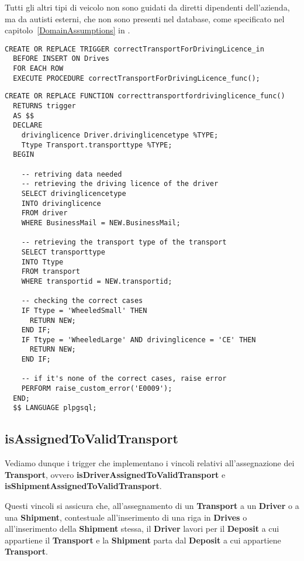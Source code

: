 Tutti gli altri tipi di veicolo non sono guidati da diretti dipendenti dell'azienda, ma da autisti esterni, che non sono presenti nel database, come specificato nel capitolo~\ref{DomainAssumptions} in .

\begin{lstlisting}[caption={Trigger per il vincolo \textbf{correctTransportForDrivingLicence}}]
  CREATE OR REPLACE TRIGGER correctTransportForDrivingLicence_in
  BEFORE INSERT ON Drives
  FOR EACH ROW
  EXECUTE PROCEDURE correctTransportForDrivingLicence_func();
\end{lstlisting}

\begin{lstlisting}[caption={Funzione per il vincolo \textbf{correctTransportForDrivingLicence}}]
  CREATE OR REPLACE FUNCTION correcttransportfordrivinglicence_func() 
  RETURNS trigger
  AS $$
  DECLARE
    drivinglicence Driver.drivinglicencetype %TYPE;
    Ttype Transport.transporttype %TYPE;
  BEGIN

    -- retriving data needed
    -- retrieving the driving licence of the driver
    SELECT drivinglicencetype
    INTO drivinglicence
    FROM driver
    WHERE BusinessMail = NEW.BusinessMail;

    -- retrieving the transport type of the transport
    SELECT transporttype
    INTO Ttype
    FROM transport
    WHERE transportid = NEW.transportid;

    -- checking the correct cases
    IF Ttype = 'WheeledSmall' THEN
      RETURN NEW;
    END IF;
    IF Ttype = 'WheeledLarge' AND drivinglicence = 'CE' THEN
      RETURN NEW;
    END IF;

    -- if it's none of the correct cases, raise error
    PERFORM raise_custom_error('E0009');
  END;
  $$ LANGUAGE plpgsql;
\end{lstlisting}


\subsection{\textbf{isAssignedToValidTransport}}

Vediamo dunque i trigger che implementano i vincoli relativi all'assegnazione dei \textbf{Transport}, ovvero \textbf{isDriverAssignedToValidTransport} e \textbf{isShipmentAssignedToValidTransport}.

Questi vincoli si assicura che, all'assegnamento di un \textbf{Transport} a un \textbf{Driver} o a una \textbf{Shipment}, contestuale all'inserimento di una riga in \textbf{Drives} o all'inserimento della \textbf{Shipment} stessa,  il \textbf{Driver} lavori per il \textbf{Deposit} a cui appartiene il \textbf{Transport} e la \textbf{Shipment} parta dal \textbf{Deposit} a cui appartiene \textbf{Transport}.

